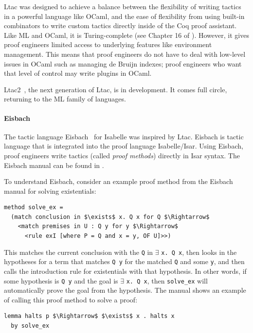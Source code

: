 Ltac was designed to
achieve a balance between the flexibility of writing tactics in a powerful language like OCaml,
and the ease of flexibility from using built-in combinators to write custom tactics
directly inside of the Coq proof assistant.
Like ML and OCaml, it is Turing-complete (see Chapter 16 of \cite{CPDT}). However, it gives proof engineers
limited access to underlying features like environment management. This means that
proof engineers do not have to deal with low-level issues in OCaml such as managing de Bruijn indexes;
proof engineers who want that level of control may write plugins in OCaml.

Ltac2~\citep{ltac2}, the next generation of Ltac, is in development.
It comes full circle, returning to the ML family of languages. 

\paragraph{Eisbach}

The tactic language Eisbach~\citep{Matichuk2015EisbachAP} for Isabelle
was inspired by Ltac. Eisbach is tactic language that is integrated
into the proof language Isabelle/Isar. Using Eisbach, proof engineers 
write tactics (called \textit{proof methods}) directly in Isar syntax.
The Eisbach manual can be found in \cite{matichuk2015eisbach}.

To understand Eisbach, consider an example proof method from the Eisbach manual for solving existentials:
\begin{lstlisting}
method solve_ex =
  (match conclusion in $\exists$ x. Q x for Q $\Rightarrow$
    <match premises in U : Q y for y $\Rightarrow$
      <rule exI [where P = Q and x = y, OF U]>>)
\end{lstlisting}
This matches the current conclusion with the \lstinline{Q} in $\exists$ \lstinline{x. Q x},
then looks in the hypotheses for a term that matches \lstinline{Q y} for the matched \lstinline{Q} and some \lstinline{y},
and then calls the introduction rule for existentials with that hypothesis. 
In other words,
if some hypothesis is \lstinline{Q y} and the goal is $\exists$ \lstinline{x. Q x},
then \lstinline{solve_ex} will automatically prove the goal from the hypothesis.
The manual shows an example of calling this proof method to solve a proof:
\begin{lstlisting}
lemma halts p $\Rightarrow$ $\exists$ x . halts x
  by solve_ex
\end{lstlisting}

